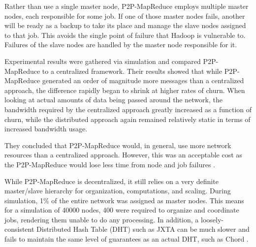Rather than use a single master node, P2P-MapReduce employs multiple master nodes, each responsible for some job.  If one of those master nodes fails, another will be ready as a backup to take its place and manage the slave nodes assigned to that job.  This avoids the single point of failure that Hadoop is vulnerable to. Failures of the slave nodes are handled by the master node responsible for it.

Experimental results were gathered via simulation and compared P2P-MapReduce to a centralized framework. Their results showed that while P2P-MapReduce generated an order of magnitude more messages than a centralized approach, the difference rapidly began to shrink at higher rates of churn.  When looking at actual amounts of data being passed around the network, the bandwidth required by the centralized approach greatly increased as a function of churn, while the distributed approach again remained relatively static in terms of increased bandwidth usage.  

They concluded that P2P-MapReduce would, in general, use more network resources than a centralized approach. However, this was an acceptable cost as the P2P-MapReduce would lose less time from node and job failures \cite{marozzo2012p2p}.

While P2P-MapReduce is decentralized, it still relies on a very definite master/slave hierarchy for organization, computations, and scaling. 
During simulation, 1\% of the entire network was assigned as master nodes. This means for a simulation of 40000 nodes, 400 were required to organize and coordinate jobs, rendering them unable to do any processing.  In addition, a loosely-consistent Distributed Hash Table (DHT) such as JXTA can be much slower and fails to maintain the same level of guarantees as an actual DHT, such as Chord \cite{5359174}.   



